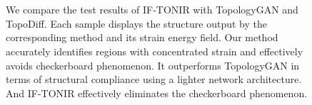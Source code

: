 \begin{figure}[!h]
\begin{graybox}
    \vspace{-1pt}
    \\
    \hspace{0.3cm}
    \hspace{0.06cm}
    \hspace{0.3cm}
    \hspace{0.06cm}
    \hspace{0.3cm}
    \hspace{0.06cm}
    \vspace{-2pt}
    \\
    \end{graybox}
    
    \caption{We compare the test results of IF-TONIR with TopologyGAN and TopoDiff. Each sample displays the structure output by the corresponding method and its strain energy field. Our method accurately identifies regions with concentrated strain and effectively avoids checkerboard phenomenon. It outperforms TopologyGAN in terms of structural compliance using a lighter network architecture. And IF-TONIR effectively eliminates the checkerboard phenomenon.}
    \label{fig:comparison}

\end{figure}